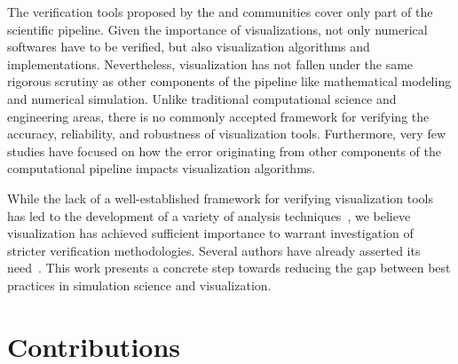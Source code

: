 The verification tools proposed by the \cs{} and \cse{} communities cover
only part of the scientific pipeline. Given the importance of visualizations, 
not only numerical softwares have to be verified, 
but also visualization algorithms and implementations.
%
Nevertheless, visualization has not fallen under the same
rigorous scrutiny as other components of the pipeline
like mathematical modeling and numerical simulation.
Unlike traditional computational science and engineering areas,
there is no commonly accepted framework for verifying the accuracy, reliability, 
and robustness of visualization tools. 
Furthermore, very few studies have focused on how the error originating from 
other components of the computational pipeline
impacts visualization algorithms. 

While the lack of a well-established framework for verifying visualization
tools has led to the development of a variety of analysis techniques~\cite{zhou01,Tory:2004:HFV:951847.951892}, we believe visualization 
has achieved sufficient importance to warrant investigation of
stricter verification methodologies. Several authors have
already asserted its need~\cite{Globus:1994:FWS:182452.182465, globus95,kirby-vv-08}. This work presents a concrete step towards reducing the gap between best practices in simulation science and visualization.

\section{Contributions}

